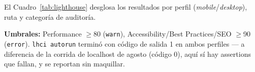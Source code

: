 El Cuadro~\ref{tab:lighthouse} desglosa los resultados por perfil
(\emph{mobile}/\emph{desktop}), ruta y categoría de auditoría.

\begin{table}[H]
\centering
\caption{Resultados Lighthouse por perfil, ruta y categoría (despliegue público)}
\label{tab:lighthouse}
\end{table}

\textbf{Umbrales:} Performance $\geq$80 (\texttt{warn}), Accessibility/Best
Practices/SEO $\geq$90 (\texttt{error}). \texttt{lhci autorun} terminó con
código de salida 1 en ambos perfiles --- a diferencia de la corrida de
localhost de agosto (código 0), aquí sí hay assertions que fallan, y se
reportan sin maquillar.

